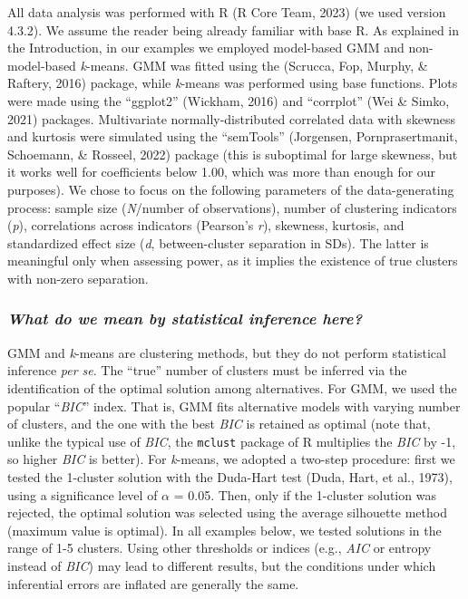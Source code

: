 \documentclass[
  man,floatsintext]{apa6}
\begin{document}
All data analysis was performed with R (R Core Team, 2023) (we used version 4.3.2). We assume the reader being already familiar with base R. As explained in the Introduction, in our examples we employed model-based GMM and non-model-based \emph{k}-means. GMM was fitted using the (Scrucca, Fop, Murphy, \& Raftery, 2016) package, while \emph{k}-means was performed using base functions. Plots were made using the ``ggplot2'' (Wickham, 2016) and ``corrplot'' (Wei \& Simko, 2021) packages. Multivariate normally-distributed correlated data with skewness and kurtosis were simulated using the ``semTools'' (Jorgensen, Pornprasertmanit, Schoemann, \& Rosseel, 2022) package (this is suboptimal for large skewness, but it works well for coefficients below 1.00, which was more than enough for our purposes). We chose to focus on the following parameters of the data-generating process: sample size (\emph{N}/number of observations), number of clustering indicators (\emph{p}), correlations across indicators (Pearson's \emph{r}), skewness, kurtosis, and standardized effect size (\emph{d}, between-cluster separation in SDs). The latter is meaningful only when assessing power, as it implies the existence of true clusters with non-zero separation.

\hypertarget{what-do-we-mean-by-statistical-inference-here}{%
\subsubsection{\texorpdfstring{\emph{What do we mean by statistical inference here?}}{What do we mean by statistical inference here?}}\label{what-do-we-mean-by-statistical-inference-here}}

GMM and \emph{k}-means are clustering methods, but they do not perform statistical inference \emph{per se}. The ``true'' number of clusters must be inferred via the identification of the optimal solution among alternatives. For GMM, we used the popular ``\emph{BIC}'' index. That is, GMM fits alternative models with varying number of clusters, and the one with the best \emph{BIC} is retained as optimal (note that, unlike the typical use of \emph{BIC}, the \texttt{mclust} package of R multiplies the \emph{BIC} by -1, so higher \emph{BIC} is better). For \emph{k}-means, we adopted a two-step procedure: first we tested the 1-cluster solution with the Duda-Hart test (Duda, Hart, et al., 1973), using a significance level of \emph{\(\alpha\)} = 0.05. Then, only if the 1-cluster solution was rejected, the optimal solution was selected using the average silhouette method (maximum value is optimal). In all examples below, we tested solutions in the range of 1-5 clusters. Using other thresholds or indices (e.g., \emph{AIC} or entropy instead of \emph{BIC}) may lead to different results, but the conditions under which inferential errors are inflated are generally the same.
\end{document}
